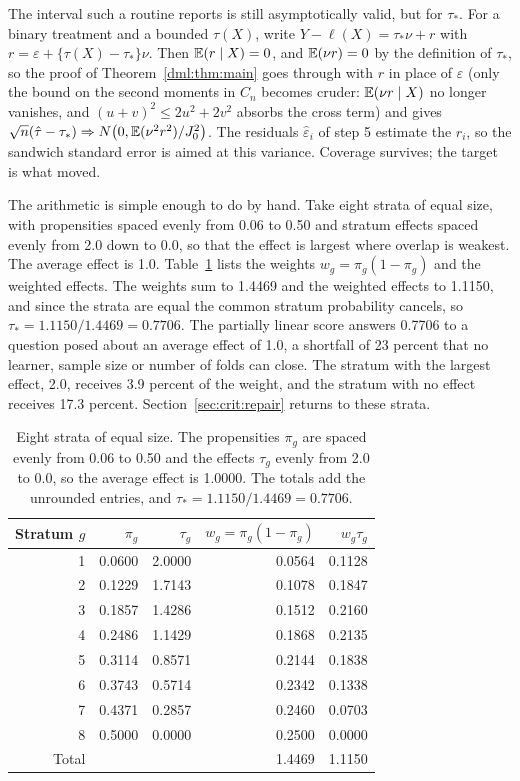 The interval such a routine reports is still asymptotically valid, but for $\tau_*$. For a binary treatment and a bounded $\tau(X)$, write $Y - \ell(X) = \tau_*\nu + r$ with $r = \varepsilon + \{\tau(X) - \tau_*\}\nu$. Then $\mathbb{E}(r \mid X) = 0$, and $\mathbb{E}(\nu r) = 0$ by the definition of $\tau_*$, so the proof of Theorem~\ref{dml:thm:main} goes through with $r$ in place of $\varepsilon$ (only the bound on the second moments in $C_n$ becomes cruder: $\mathbb{E}(\nu r \mid X)$ no longer vanishes, and $(u + v)^2 \le 2u^2 + 2v^2$ absorbs the cross term) and gives $\sqrt{n}(\hat\tau - \tau_*) \Rightarrow N\bigl(0, \mathbb{E}(\nu^2 r^2)/J_0^2\bigr)$. The residuals $\hat\varepsilon_i$ of step 5 estimate the $r_i$, so the sandwich standard error is aimed at this variance. Coverage survives; the target is what moved.

The arithmetic is simple enough to do by hand. Take eight strata of equal size, with propensities spaced evenly from 0.06 to 0.50 and stratum effects spaced evenly from 2.0 down to 0.0, so that the effect is largest where overlap is weakest. The average effect is 1.0. Table~\ref{tab:dml:strata} lists the weights $w_g = \pi_g(1 - \pi_g)$ and the weighted effects. The weights sum to 1.4469 and the weighted effects to 1.1150, and since the strata are equal the common stratum probability cancels, so $\tau_* = 1.1150/1.4469 = 0.7706$. The partially linear score answers 0.7706 to a question posed about an average effect of 1.0, a shortfall of 23 percent that no learner, sample size or number of folds can close. The stratum with the largest effect, 2.0, receives 3.9 percent of the weight, and the stratum with no effect receives 17.3 percent. Section~\ref{sec:crit:repair} returns to these strata.

\begin{table}[ht]
\centering
\caption{Eight strata of equal size. The propensities $\pi_g$ are spaced evenly from 0.06 to 0.50 and the effects $\tau_g$ evenly from 2.0 to 0.0, so the average effect is 1.0000. The totals add the unrounded entries, and $\tau_* = 1.1150/1.4469 = 0.7706$.}
\label{tab:dml:strata}
\small
\begin{tabular}{rrrrr}
\toprule
Stratum $g$ & $\pi_g$ & $\tau_g$ & $w_g = \pi_g(1 - \pi_g)$ & $w_g\tau_g$ \\
\midrule
1 & 0.0600 & 2.0000 & 0.0564 & 0.1128 \\
2 & 0.1229 & 1.7143 & 0.1078 & 0.1847 \\
3 & 0.1857 & 1.4286 & 0.1512 & 0.2160 \\
4 & 0.2486 & 1.1429 & 0.1868 & 0.2135 \\
5 & 0.3114 & 0.8571 & 0.2144 & 0.1838 \\
6 & 0.3743 & 0.5714 & 0.2342 & 0.1338 \\
7 & 0.4371 & 0.2857 & 0.2460 & 0.0703 \\
8 & 0.5000 & 0.0000 & 0.2500 & 0.0000 \\
\midrule
Total & & & 1.4469 & 1.1150 \\
\bottomrule
\end{tabular}
\end{table}

